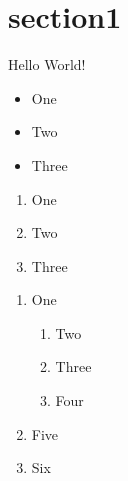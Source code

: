 \documentclass{article}
\begin{document}

\section{section1}
Hello World!
\\
\begin{itemize}
	\item One
	\item Two
	\item Three
\end{itemize}

\begin{enumerate}
	\item One
	\item Two
	\item Three
\end{enumerate}

\begin{enumerate}
	\item One
    \begin{enumerate}
    	\item Two
        \item Three
        \item Four
    \end{enumerate}
    \item Five
    \item Six
\end{enumerate}
\end{document}
